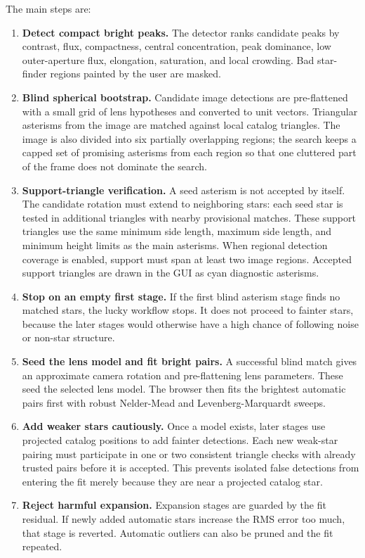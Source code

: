 \documentclass[11pt]{article}
\begin{document}
The main steps are:
\begin{enumerate}
  \item \textbf{Detect compact bright peaks.} The detector ranks candidate
        peaks by contrast, flux, compactness, central concentration, peak
        dominance, low outer-aperture flux, elongation, saturation, and local
        crowding. Bad star-finder regions painted by the user are masked.
  \item \textbf{Blind spherical bootstrap.} Candidate image detections are
        pre-flattened with a small grid of lens hypotheses and converted to
        unit vectors. Triangular asterisms from the image are matched against
        local catalog triangles. The image is also divided into six partially
        overlapping regions; the search keeps a capped set of promising
        asterisms from each region so that one cluttered part of the frame
        does not dominate the search.
  \item \textbf{Support-triangle verification.} A seed asterism is not accepted
        by itself. The candidate rotation must extend to neighboring stars:
        each seed star is tested in additional triangles with nearby provisional
        matches. These support triangles use the same minimum side length,
        maximum side length, and minimum height limits as the main asterisms.
        When regional detection coverage is enabled, support must span at
        least two image regions. Accepted support triangles are drawn in the
        GUI as cyan diagnostic asterisms.
  \item \textbf{Stop on an empty first stage.} If the first blind asterism
        stage finds no matched stars, the lucky workflow stops. It does not
        proceed to fainter stars, because the later stages would otherwise have
        a high chance of following noise or non-star structure.
  \item \textbf{Seed the lens model and fit bright pairs.} A successful blind
        match gives an approximate camera rotation and pre-flattening lens
        parameters. These seed the selected lens model. The browser then fits
        the brightest automatic pairs first with robust Nelder-Mead and
        Levenberg-Marquardt sweeps.
  \item \textbf{Add weaker stars cautiously.} Once a model exists, later stages
        use projected catalog positions to add fainter detections. Each new
        weak-star pairing must participate in one or two consistent triangle
        checks with already trusted pairs before it is accepted. This prevents
        isolated false detections from entering the fit merely because they are
        near a projected catalog star.
  \item \textbf{Reject harmful expansion.} Expansion stages are guarded by the
        fit residual. If newly added automatic stars increase the RMS error too
        much, that stage is reverted. Automatic outliers can also be pruned and
        the fit repeated.
\end{enumerate}
\end{document}
